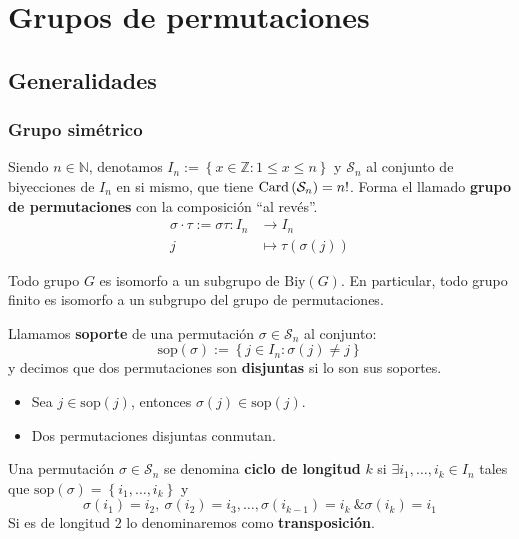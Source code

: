 \chapter{Grupos de permutaciones}
\section{Generalidades}
\subsection{Grupo simétrico}
    Siendo $n \in \mathbb{N}$, denotamos $I_n := \left\{ x \in \mathbb{Z} : 1 \le x \le n \right\}$ y $\mathcal{S}_n$ al conjunto de biyecciones de $I_n$ en si mismo, que tiene $\operatorname{Card}\left( \mathcal{S}_n \right) = n!$. Forma el llamado \textbf{grupo de permutaciones} con la composición ``al revés''.
    \begin{align*}
        \sigma \cdot \tau := \sigma \tau : I_n &\rightarrow I_n\\
        j &\mapsto \tau\left( \sigma \left( j \right) \right)
    \end{align*}

    \begin{theo}[de Cayley]
        Todo grupo $G$ es isomorfo a un subgrupo de $\mathrm{Biy}\left( G \right)$. En particular, 
        todo grupo finito es isomorfo a un subgrupo del grupo de permutaciones.
    \end{theo}

    \begin{defi}[Soporte]
        Llamamos \textbf{soporte} de una permutación $\sigma \in \mathcal{S}_n$ al conjunto:
        \[
        \mathrm{sop}\left( \sigma \right) := \left\{ j \in I_n: \sigma\left( j \right) \neq j \right\}
        \]
        y decimos que dos permutaciones son \textbf{disjuntas} si lo son sus soportes.
    \end{defi}

    \begin{prop}
        \begin{itemize}
        \item Sea $j \in \mathrm{sop}\left( j \right)$, entonces $\sigma\left( j \right) \in \mathrm{sop}\left( j \right)$.
        \item Dos permutaciones disjuntas conmutan.
        \end{itemize}
    \end{prop}

    \begin{defi}[Ciclos]
        Una permutación $\sigma \in \mathcal{S}_n$ se denomina \textbf{ciclo de longitud} $k$ si $\exists i_1, \ldots, i_k \in I_n$ tales que $\mathrm{sop}\left( \sigma \right) = \left\{ i_1, \ldots, i_k \right\}$ y
        \[
            \sigma\left( i_1 \right) = i_2,\ \sigma\left( i_2 \right) = i_3, \ldots, \sigma\left( i_{k-1} \right) = i_k\ \& \sigma\left( i_k \right) = i_1
        \]
        Si es de longitud $2$ lo denominaremos como \textbf{transposición}.
    \end{defi}

